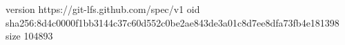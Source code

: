version https://git-lfs.github.com/spec/v1
oid sha256:8d4c0000f1bb3144c37c60d552c0be2ae843de3a01c8d7ee8dfa73fb4e181398
size 104893
